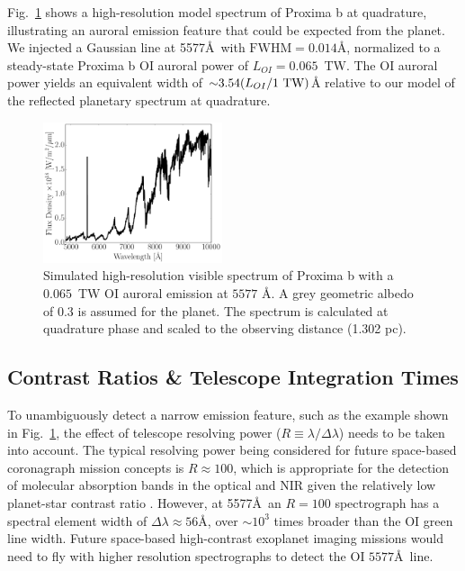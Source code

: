 \documentclass{emulateapj}
\newcommand{\xxx}[1]{{\color{red} #1}} %
\newcommand{\yyy}[1]{{\color{black} #1}} %
\begin{document}
Fig.~\ref{fig:spec} shows a high-resolution model spectrum of Proxima b at quadrature, illustrating an auroral emission feature that could be expected from the planet. We injected a Gaussian line at 5577\AA\ with $\text{FWHM} = 0.014$\AA, normalized to a steady-state Proxima b OI auroral power of $L_{OI} = 0.065$~TW. The OI auroral power yields an equivalent width of \yyy{${\sim} 3.54 (L_{OI}/1 {\rm \ TW})$\AA} relative to our model of the reflected planetary spectrum at quadrature.

\begin{figure}[bt]
\includegraphics[width=0.47\textwidth]{OI_ref_spec.pdf}
\caption{Simulated high-resolution visible spectrum of Proxima b with a $0.065$~TW OI auroral emission at $5577$ \AA. A grey geometric albedo of 0.3 is assumed for the planet. The spectrum is calculated at quadrature phase and scaled to the observing distance (1.302 pc).} %
\label{fig:spec}
\end{figure}

\subsection{Contrast Ratios \& Telescope Integration Times}
\label{sec:int_times}

To unambiguously detect a narrow emission feature, such as the example shown in Fig.\ \ref{fig:spec}, the effect of telescope resolving power ($R \equiv \lambda / \Delta \lambda$) needs to be taken into account. The typical resolving power being considered for future space-based coronagraph mission concepts is $R \approx 100$, which is appropriate for the detection of molecular absorption bands in the optical and NIR given the relatively low planet-star contrast ratio \citep{Robinson2016}. However, at 5577\AA\ an $R=100$ spectrograph has a spectral element width of $\Delta \lambda \approx 56$\AA, over ${\sim} 10^3$ times broader than the OI green line width. Future space-based high-contrast exoplanet imaging missions would need to fly with higher resolution spectrographs to detect the OI $5577$\AA\ line.
\end{document}

